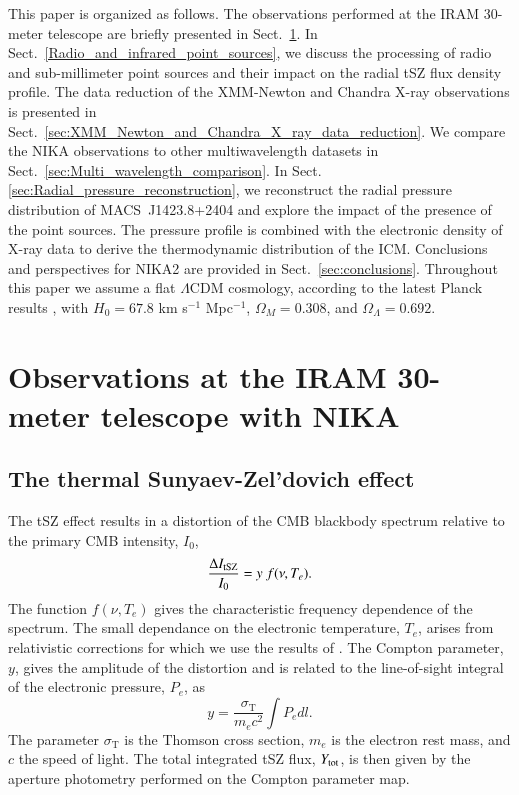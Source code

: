 \documentclass[traditabstract]{aa}
\begin{document}
This paper is organized as follows. The observations performed at the IRAM 30-meter telescope are briefly presented in Sect.~\ref{sec:Observation_at_the_IRAM_30m_telescope_with_NIKA}. In Sect.~\ref{Radio_and_infrared_point_sources}, we discuss the processing of radio and sub-millimeter point sources and their impact on the radial tSZ flux density profile. The data reduction of the XMM-Newton and Chandra X-ray observations is presented in Sect.~\ref{sec:XMM_Newton_and_Chandra_X_ray_data_reduction}. We compare the NIKA observations to other multiwavelength datasets in Sect.~\ref{sec:Multi_wavelength_comparison}. In Sect. \ref{sec:Radial_pressure_reconstruction}, we reconstruct the radial pressure distribution of \mbox{MACS~J1423.8+2404} and explore the impact of the presence of the point sources. The pressure profile is combined with the electronic density of X-ray data to derive the thermodynamic distribution of the ICM. Conclusions and perspectives for NIKA2 are provided in Sect.~\ref{sec:conclusions}. Throughout this paper we assume a flat $\Lambda$CDM cosmology, according to the latest Planck results \citep{planck2014param}, with $H_0 = 67.8$ km s$^{-1}$ Mpc$^{-1}$, $\Omega_M = 0.308$, and $\Omega_{\Lambda} = 0.692$.

\section{Observations at the IRAM 30-meter telescope with NIKA}\label{sec:Observation_at_the_IRAM_30m_telescope_with_NIKA}
\subsection{The thermal Sunyaev-Zel'dovich effect}
The tSZ effect \citep{sunyaev1972,sunyaev1980} results in a distortion of the CMB blackbody spectrum relative to the primary CMB intensity, $I_0$, \citep[e.g.,][]{birkinshaw1999}
\begin{equation}
        \frac{\Delta I_{\rm tSZ}}{I_0} = y \ f(\nu, T_e).
\label{eq:deltaI}
\end{equation}
The function $f(\nu, T_e)$ gives the characteristic frequency dependence of the spectrum. The small dependance on the electronic temperature, $T_e$, arises from relativistic corrections for which we use the results of \cite{itoh1998}. The Compton parameter, $y$, gives the amplitude of the distortion and is related to the line-of-sight integral of the electronic pressure, $P_e$, as 
\begin{equation}
        y = \frac{\sigma_{\mathrm{T}}}{m_{e} c^2} \int P_{e} dl.
        \label{eq:y_compton}
\end{equation}
The parameter $\sigma_{\mathrm{T}}$ is the Thomson cross section, $m_{e}$ is the electron rest mass, and $c$ the speed of light. The total integrated tSZ flux, $Y_{\rm tot}$, is then given by the aperture photometry performed on the Compton parameter map.
\end{document}
